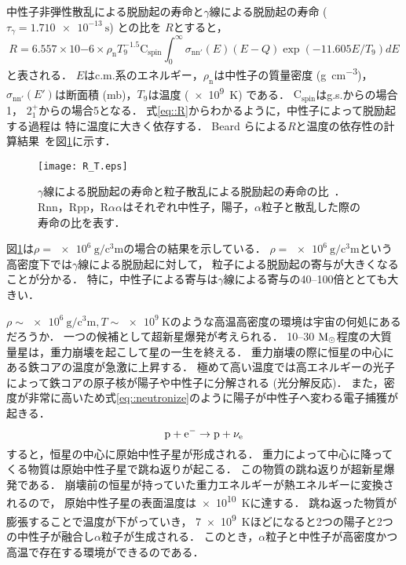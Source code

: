 \documentclass[../master]{subfiles}
\begin{document}
中性子非弾性散乱による脱励起の寿命と$\gamma$線による脱励起の寿命 ($\tau_{\gamma} = \SI{1.710e-13}{\second}$) との比を
$R$とすると，
\begin{equation}
  R = 6.557\times10{-6}\times\rho_{\text{n}}T_{9}^{-1.5}\mathrm{C}_{{\text{spin}}}
  \int^{\infty}_{0}\sigma_{\text{nn}'}(E)(E-Q)\exp(-11.605E/T_{9})dE
  \label{eq::R}
\end{equation}
と表される．
$E$はc.m.系のエネルギー，$\rho_{\text{n}}$は中性子の質量密度 (\si{\gram\per\cubic\centi\metre})，
$\sigma_{\text{nn}'}(E')$は断面積 (\si{\milli\barn})，$T_{9}$は温度 (\SI{e9}{\kelvin}) である．
$\mathrm{C}_{{\text{spin}}}$はg.s.からの場合1，
$2_{1}^{+}$からの場合5となる．
式\eqref{eq::R}からわかるように，中性子によって脱励起する過程は
特に温度に大きく依存する．
Beard らによる$R$と温度の依存性の計算結果~\cite{hotdensemedium}を図\ref{fig::R}に示す．
\begin{figure}
  \centering
  \texttt{[image: R\_T.eps]}
  \caption[$\gamma$線による脱励起の寿命と粒子散乱による脱励起の寿命の比．]
          {$\gamma$線による脱励起の寿命と粒子散乱による脱励起の寿命の比~\cite{hotdensemedium}．
    Rnn，Rpp，R$\alpha\alpha$はそれぞれ中性子，陽子，$\alpha$粒子と散乱した際の寿命の比を表す．}
  \label{fig::R}
\end{figure}%
図\ref{fig::R}は$\rho = \SI{e6}{\gram\per\cubic\centi\metre}$の場合の結果を示している．
$\rho = \SI{e6}{\gram\per\cubic\centi\metre}$という高密度下では$\gamma$線による脱励起に対して，
粒子による脱励起の寄与が大きくなることが分かる．
特に，中性子による寄与は$\gamma$線による寄与の40--100倍ととても大きい．

$\rho\sim\SI{e6}{\gram\per\cubic\centi\metre}, T\sim\SI{e9}{\kelvin}$のような高温高密度の環境は宇宙の何処にあるだろうか．
一つの候補として超新星爆発が考えられる．
10--30 $\rm M_{\odot}$程度の大質量星は，重力崩壊を起こして星の一生を終える．
重力崩壊の際に恒星の中心にある鉄コアの温度が急激に上昇する．
極めて高い温度では高エネルギーの光子によって鉄コアの原子核が陽子や中性子に分解される (光分解反応)．
また，密度が非常に高いため式\eqref{eq::neutronize}のように陽子が中性子へ変わる電子捕獲が起きる．
\begin{equation}
  {\rm p}+{\rm e}^{-} \rightarrow {\rm p}+\nu_{\rm e}
  \label{eq::neutronize}
\end{equation}
すると，恒星の中心に原始中性子星が形成される．
重力によって中心に降ってくる物質は原始中性子星で跳ね返りが起こる．
この物質の跳ね返りが超新星爆発である．
崩壊前の恒星が持っていた重力エネルギーが熱エネルギーに変換されるので，
原始中性子星の表面温度は\SI{e10}{\kelvin}に達する．
跳ね返った物質が膨張することで温度が下がっていき，
\SI{7e9}{\kelvin}ほどになると2つの陽子と2つの中性子が融合し$\alpha$粒子が生成される．
このとき，$\alpha$粒子と中性子が高密度かつ高温で存在する環境ができるのである．
\end{document}
